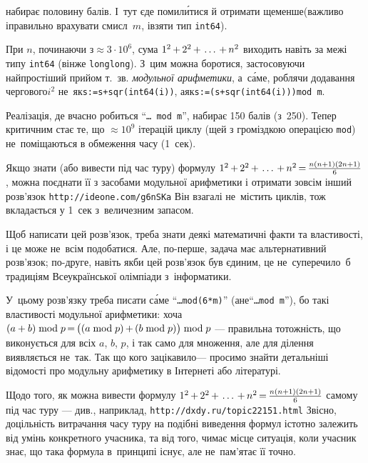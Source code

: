 \documentclass[14pt,a4paper]{extarticle}
\def\dib#1{\,#1\discretionary{}{\mbox{$#1$}}{}\,}
\begin{document}
 набирає половину балів. 
І~тут є\nolinebreak[2] де помил\'{и}тися й отримати ще\nolinebreak[3] менше\nolinebreak[3] (важливо і\nolinebreak[3] правильно врахувати смисл~$m$, і\nolinebreak[3] взяти тип \texttt{int64}).

При $n$, починаючи з${}\approx3{\cdot}10^6$, сума $1^2\dib{{+}}2^2\dib{{+}}\dots\dib{{+}}n^2$ виходить навіть за межі типу \texttt{int64} (він\nolinebreak[3] же \texttt{long\nolinebreak[3] long}). З~цим можна боротися, застосовуючи найпростіший прийом т.~зв. \emph{модульної арифметики}, а~с\'{а}ме, роблячи додавання чергового\nolinebreak[3] $i^2$ не~як\nolinebreak[3] \verb"s:=s+sqr(int64(i))", а\nolinebreak[2] як\nolinebreak[3] \verb"s:=(s+sqr(int64(i)))mod m". 

Реалізація, де вчасно робиться ``\texttt{\dots~mod~m}'', набирає 150 балів (з~250). 
Тепер критичним стає те, що $\approx{}10^9$ ітерацій циклу (ще\nolinebreak[3] й з громіздкою операцією \texttt{mod}) не~поміщаються в обмеження часу (1~сек).

Якщо знати (або вивести під час туру) формулу $1^2\dib{{+}}2^2\dib{{+}}\dots\dib{{+}}n^2\dib{{=}}\frac{n(n+1)(2n+1)}{6}$, можна поєднати її з засобами модульної арифметики і отримати зовсім інший розв'язок \verb"http://ideone.com/g6nSKa"\hspace{0.5em plus 1em} Він взагалі не~містить циклів, тож вкладається у 1~сек з~величезним запасом.


Щоб написати цей розв'язок, треба знати деякі математичні факти та властивості, і це може не~всім подобатися. Але, по-перше, задача має альтернативний розв'язок; по-друге, навіть якби цей розв'язок був єдиним, це не~суперечило~б традиціям Всеукраїнської олімпіади з~інформатики.

У~цьому розв'язку треба писати с\'{а}ме ``\texttt{\dots\nolinebreak[3] mod\nolinebreak[3] \mbox{(6*m)}}'' (а\nolinebreak[2] не\nolinebreak[3] ``\texttt{\dots\nolinebreak[3] mod~m}''), бо такі властивості модульної арифметики: хоча ${(a+b)\bmod p} \dib{{=}} {\bigl((a\bmod p)}\dib{{+}}{(b\bmod p)\bigr)\bmod p}$ --- правильна тотожність, що виконується для всіх $a$, $b$, $p$, і так само для множення, але для ділення виявляється не~так.
Так що кого зацікавило\nolinebreak[3] --- просимо знайти детальніші відомості про модульну арифметику в Інтернеті або літературі.

Щодо того, як можна вивести формулу $1^2\dib{{+}}2^2\dib{{+}}\dots\dib{{+}}n^2\dib{{=}}\frac{n(n+1)(2n+1)}{6}$ самому під час туру --- див., наприклад, \verb"http://dxdy.ru/topic22151.html"\hspace{0.5em plus 1em} Звісно, доцільність витрачання часу туру на подібні виведення формул істотно залежить від умінь конкретного учасника, та від того, чи\nolinebreak[3] має місце ситуація, коли учасник знає, що така формула в~принципі існує, але не~пам'ятає її точно.
\end{document}
